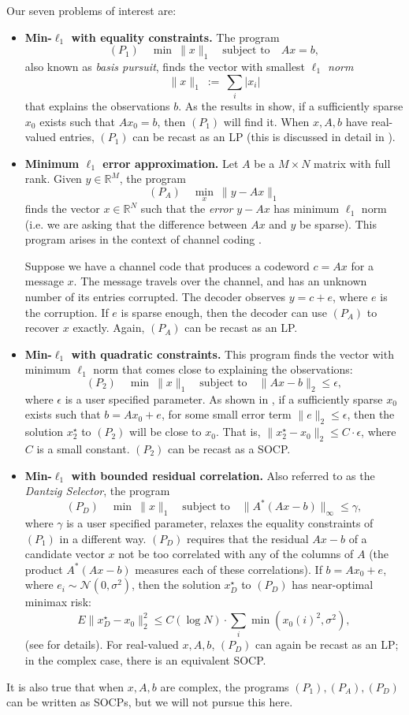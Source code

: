 \documentclass{article}
\newcommand{\R}{\mathbb{R}}
\newcommand{\<}{\langle}
\renewcommand{\>}{\rangle}
\begin{document}
Our seven problems of interest are:
\begin{itemize}
%
\item {\bf Min-$\ell_1$ with equality constraints.}  The program
\[
(P_1) \quad \min~\|x\|_1\quad\text{subject~to}\quad Ax=b,
\]
also known as {\em basis pursuit}, finds the vector with smallest {\em $\ell_1$ norm}
\[
\|x\|_1 ~:=~ \sum_i |x_i|
\]
that explains the observations $b$.
As the results in \cite{candes04ro,candes04ne} show, if a sufficiently sparse $x_0$ exists such that $Ax_0=b$,
then $(P_1)$ will find it.  When $x,A,b$ have real-valued entries, $(P_1)$ can be recast as an LP (this is discussed in detail in \cite{chen99at}).  
%
\item {\bf Minimum $\ell_1$ error approximation.}  Let $A$ be a $M\times N$ matrix with full rank.  Given $y\in\R^M$, the program
\[
(P_A) \quad \min_x~\|y-Ax\|_1
\]
finds the vector $x\in\R^N$ such that the {\em error} $y-Ax$ has minimum 
$\ell_1$ norm (i.e. we are asking that the difference between $Ax$ and $y$ be sparse).
This program arises in the context of channel coding \cite{candes05de}. 

Suppose we have a channel code that produces a codeword $c=Ax$ for a message $x$.  The message travels over the channel, and has an unknown number of its entries corrupted.  The decoder observes $y = c + e$, where $e$ is the corruption.
If $e$ is sparse enough, then the decoder can use $(P_A)$ to recover $x$ exactly.  Again, $(P_A)$ can be recast as an LP.
%
\item {\bf Min-$\ell_1$ with quadratic constraints.}  This program finds the
vector with minimum $\ell_1$ norm that comes close to explaining the observations:
\[
(P_2) \quad \min~\|x\|_1\quad\text{subject~to}\quad \|Ax-b\|_2\leq \epsilon,
\]
where $\epsilon$ is a user specified parameter.  As shown in \cite{candes05st}, if a sufficiently sparse $x_0$ exists such that $b = Ax_0 + e$, for some small error term $\|e\|_2\leq\epsilon$, then the solution $x^\star_2$ to $(P_2)$ will be close to $x_0$.  That is, $\|x^\star_2-x_0\|_2\leq C\cdot\epsilon$, where $C$ is a small constant.  $(P_2)$ can be recast as a SOCP.
%
\item {\bf Min-$\ell_1$ with bounded residual correlation.} Also referred to as the {\em Dantzig Selector},
the program
\[
(P_D) \quad \min~\|x\|_1\quad\text{subject~to}\quad \|A^*(Ax-b)\|_\infty\leq\gamma,
\]
where $\gamma$ is a user specified parameter,
relaxes the equality constraints of $(P_1)$ in a different way.  $(P_D)$ requires that the residual $Ax-b$
of a candidate vector $x$ not be too correlated with any of the columns of $A$ (the product $A^*(Ax-b)$ measures each of these correlations).  If $b = Ax_0 + e$, where $e_i\sim \mathcal{N}(0,\sigma^2)$, then the solution $x^\star_D$ to $(P_D)$ has near-optimal minimax risk:
\[
E\|x^\star_D-x_0\|^2_2 \leq C (\log N)\cdot\sum_i \min(x_0(i)^2, \sigma^2),
\]
(see \cite{candes05da} for details).  For real-valued $x,A,b$, $(P_D)$ can again be recast as an LP; in the complex case, there is an equivalent SOCP.
%
\end{itemize}
It is also true that when $x,A,b$ are complex, the programs $(P_1),(P_A),(P_D)$ can be written as SOCPs, but we will not pursue this here.
\end{document}

